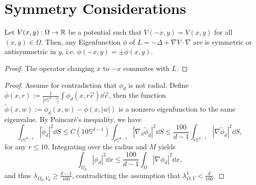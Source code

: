 \section{Symmetry Considerations}

\begin{proposition}\label{prop:eig_symm}
    Let $V(x,y) : \Omega \to \mathbb{R}$ be a potential such that $V(-x,y) = V(x,y)$ for all $(x,y) \in \Omega$. Then, any Eigenfunction $\phi$ of $L = -\Delta + \nabla V \cdot \nabla$ are is symmetric or antisymmetric in $y$, i.e. $\phi(-x,y) = \pm \phi(x,y)$.
\end{proposition}
\begin{proof}
    The operator changing $x$ to $-x$ commutes with $L$.
\end{proof}

\propradial*
\begin{proof}
    Assume for contradiction that $\phi_d$ is not radial. Define $\overline \phi(x,r) := \frac{1}{|r\mathbb{S}^{d-1}|}\int \phi_d(x,r \vec{e}) \dd{\vec{e}}$, then the function $\tilde \phi(x,w) := \phi_d(x,w) - \overline \phi(x,|w|)$ is a nonzero eigenfunction to the same eigenvalue. By Poincaré's inequality, we have
    $$
    \int_{r \mathbb{S}^{d-1}} |\tilde\phi_d|^2 \dd{S} 
    \le C(10 \mathbb{S}^{d-1}) \int_{r \mathbb{S}^{d-1}} |\nabla_S \tilde\phi_d|^2 \dd{S} 
    \le \frac{100}{d-1}\int_{r \mathbb{S}^{d-1}} |\nabla \tilde\phi_d|^2 \dd{S},
    $$
    for any $r\le 10$. Integrating over the radius and $M$ yields
    $$
    \int_{\Omega_d} |\phi_d|^2 \dd{x} 
    \le \frac{100}{d-1}\int_\Omega |\nabla \phi_d|^2 \dd{x},
    $$
    and thus $\lambda_{\Omega_d, V_d} \ge \frac{d-1}{100}$, contradicting the assumption that $\lambda^{1}_{\Omega,V}<\frac{d}{100}$.
\end{proof}